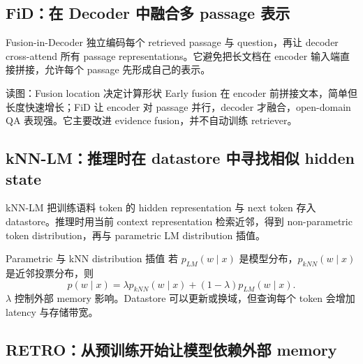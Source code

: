 
\subsection{FiD：在 Decoder 中融合多 passage 表示}

Fusion-in-Decoder 独立编码每个 retrieved passage 与 question，再让 decoder cross-attend 所有 passage representations。它避免把长文档在 encoder 输入端直接拼接，允许每个 passage 先形成自己的表示。


\begin{knowledgebox}{读图：Fusion location 决定计算形状}
Early fusion 在 encoder 前拼接文本，简单但长度快速增长；FiD 让 encoder 对 passage 并行，decoder 才融合，open-domain QA 表现强。它主要改进 evidence fusion，并不自动训练 retriever。
\end{knowledgebox}

\subsection{kNN-LM：推理时在 datastore 中寻找相似 hidden state}

kNN-LM 把训练语料 token 的 hidden representation 与 next token 存入 datastore。推理时用当前 context representation 检索近邻，得到 non-parametric token distribution，再与 parametric LM distribution 插值。


\begin{importantbox}{Parametric 与 kNN distribution 插值}
若 $p_{LM}(w\mid x)$ 是模型分布，$p_{kNN}(w\mid x)$ 是近邻投票分布，则
\[
p(w\mid x)=\lambda p_{kNN}(w\mid x)+(1-\lambda)p_{LM}(w\mid x).
\]
$\lambda$ 控制外部 memory 影响。Datastore 可以更新或换域，但查询每个 token 会增加 latency 与存储带宽。
\end{importantbox}

\subsection{RETRO：从预训练开始让模型依赖外部 memory}

